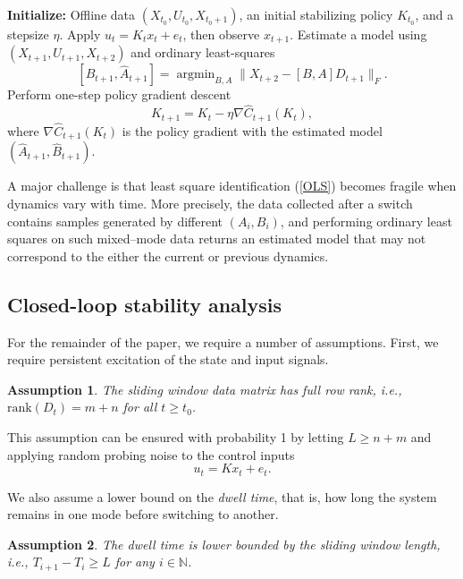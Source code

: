 \documentclass[letterpaper, 10 pt, conference]{ieeeconf}  %
\newtheorem{assum}{Assumption}
\begin{document}
\begin{algorithm}
\caption{Policy gradient adaptive control for linear switched systems with sliding window data}
\label{algo2_switch}
\begin{algorithmic}[1]
\State \textbf{Initialize:} Offline data \((X_{t_0}, U_{t_0}, X_{t_0+1})\), an initial stabilizing policy \(K_{t_0}\), and a stepsize \(\eta\).
    \State Apply \(u_t = K_t x_t + e_t\), then observe \(x_{t+1}\).
    \State Estimate a model using $(X_{t+1}, U_{t+1}, X_{t+2})$ and ordinary least-squares
    \[
    [\hat{B}_{t+1}, \hat{A}_{t+1}] = \mathop{\arg\min}_{B, A} \| X_{t+2} - [B, A] D_{t+1} \|_F.
    \]
    \State Perform one-step policy gradient descent
    \begin{equation}\label{equ:mbgd}
    K_{t+1} = K_t - \eta \nabla \hat{C}_{t+1}(K_t),    
    \end{equation} 
    where \(\nabla \hat{C}_{t+1}(K_t)\) is the policy gradient with the estimated model \((\hat{A}_{t+1}, \hat{B}_{t+1})\).
\EndFor
\end{algorithmic}
\end{algorithm}

A major challenge is that least square identification (\ref{OLS}) becomes fragile when dynamics vary with time. More precisely, the data collected after a switch contains samples generated by different $(A_i,B_i)$, and performing ordinary least squares on such mixed–mode data returns an estimated model that may not correspond to the either the current or previous dynamics. 
  
\subsection{Closed-loop stability analysis}
For the remainder of the paper, we require a number of assumptions. First, we require persistent excitation of the state and input signals.
\begin{assum} \label{ass1}
    The sliding window data matrix has full row rank, i.e., $\textrm{rank}(D_t)=m+n$ for all $t \geq t_0$.
\end{assum}

This assumption can be ensured with probability 1 by letting $L \geq n+m$ and applying random probing noise to the control inputs
\begin{equation}
    u_t = Kx_t + e_t.
\end{equation}

We also assume a lower bound on the \textit{dwell time}, that is, how long the system remains in one mode before switching to another.
\begin{assum} \label{ass2}
    The dwell time is lower bounded by the sliding window length, i.e.,  $T_{i+1} - T_i \geq L$ for any $i \in \mathbb{N}$. 
\end{assum}
\end{document}
